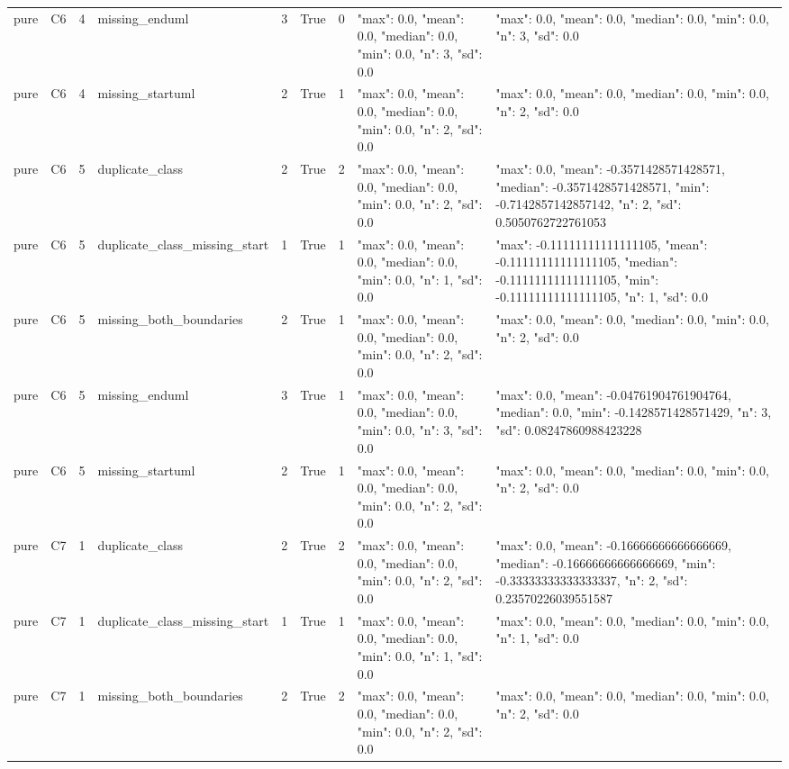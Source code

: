 \begin{tabular}{lllllllll}
pure & C6 & 4 & missing\_enduml & 3 & True & 0 & {"max": 0.0, "mean": 0.0, "median": 0.0, "min": 0.0, "n": 3, "sd": 0.0} & {"max": 0.0, "mean": 0.0, "median": 0.0, "min": 0.0, "n": 3, "sd": 0.0} \\
pure & C6 & 4 & missing\_startuml & 2 & True & 1 & {"max": 0.0, "mean": 0.0, "median": 0.0, "min": 0.0, "n": 2, "sd": 0.0} & {"max": 0.0, "mean": 0.0, "median": 0.0, "min": 0.0, "n": 2, "sd": 0.0} \\
pure & C6 & 5 & duplicate\_class & 2 & True & 2 & {"max": 0.0, "mean": 0.0, "median": 0.0, "min": 0.0, "n": 2, "sd": 0.0} & {"max": 0.0, "mean": -0.3571428571428571, "median": -0.3571428571428571, "min": -0.7142857142857142, "n": 2, "sd": 0.5050762722761053} \\
pure & C6 & 5 & duplicate\_class\_missing\_start & 1 & True & 1 & {"max": 0.0, "mean": 0.0, "median": 0.0, "min": 0.0, "n": 1, "sd": 0.0} & {"max": -0.11111111111111105, "mean": -0.11111111111111105, "median": -0.11111111111111105, "min": -0.11111111111111105, "n": 1, "sd": 0.0} \\
pure & C6 & 5 & missing\_both\_boundaries & 2 & True & 1 & {"max": 0.0, "mean": 0.0, "median": 0.0, "min": 0.0, "n": 2, "sd": 0.0} & {"max": 0.0, "mean": 0.0, "median": 0.0, "min": 0.0, "n": 2, "sd": 0.0} \\
pure & C6 & 5 & missing\_enduml & 3 & True & 1 & {"max": 0.0, "mean": 0.0, "median": 0.0, "min": 0.0, "n": 3, "sd": 0.0} & {"max": 0.0, "mean": -0.04761904761904764, "median": 0.0, "min": -0.1428571428571429, "n": 3, "sd": 0.08247860988423228} \\
pure & C6 & 5 & missing\_startuml & 2 & True & 1 & {"max": 0.0, "mean": 0.0, "median": 0.0, "min": 0.0, "n": 2, "sd": 0.0} & {"max": 0.0, "mean": 0.0, "median": 0.0, "min": 0.0, "n": 2, "sd": 0.0} \\
pure & C7 & 1 & duplicate\_class & 2 & True & 2 & {"max": 0.0, "mean": 0.0, "median": 0.0, "min": 0.0, "n": 2, "sd": 0.0} & {"max": 0.0, "mean": -0.16666666666666669, "median": -0.16666666666666669, "min": -0.33333333333333337, "n": 2, "sd": 0.23570226039551587} \\
pure & C7 & 1 & duplicate\_class\_missing\_start & 1 & True & 1 & {"max": 0.0, "mean": 0.0, "median": 0.0, "min": 0.0, "n": 1, "sd": 0.0} & {"max": 0.0, "mean": 0.0, "median": 0.0, "min": 0.0, "n": 1, "sd": 0.0} \\
pure & C7 & 1 & missing\_both\_boundaries & 2 & True & 2 & {"max": 0.0, "mean": 0.0, "median": 0.0, "min": 0.0, "n": 2, "sd": 0.0} & {"max": 0.0, "mean": 0.0, "median": 0.0, "min": 0.0, "n": 2, "sd": 0.0} \\

\end{tabular}
